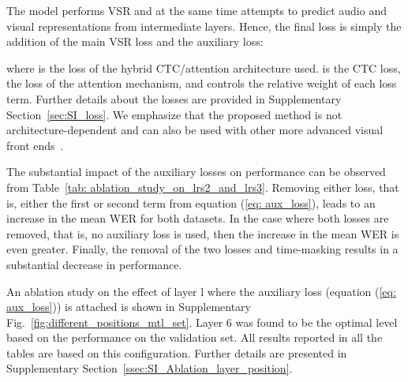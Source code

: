 \documentclass[twocolumn]{article}
\begin{document}
The model performs VSR and at the same time attempts to predict audio and visual representations from intermediate layers. Hence, the final loss is simply the addition of the main VSR loss and the auxiliary loss:





where  is the loss of the hybrid CTC/attention architecture used.  is the CTC loss,  the loss of the attention mechanism, and  controls the relative weight of each loss term. Further details about the losses are provided in Supplementary Section~\ref{sec:SI_loss}. We emphasize that the proposed method is not architecture-dependent and can also be used with other more advanced visual front ends~\cite{serdyuk2022transformer}.

The substantial impact of the auxiliary losses on performance can be observed from Table~\ref{tab: ablation_study_on_lrs2_and_lrs3}. Removing either loss, that is, either the first or second term from equation (\ref{eq: aux_loss}), leads to an increase in the mean WER for both datasets. In the case where both losses are removed, that is, no auxiliary loss is used, then the increase in the mean WER is even greater. Finally, the removal of the two losses and time-masking results in a substantial decrease in performance.

An ablation study on the effect of layer l where the auxiliary loss (equation (\ref{eq: aux_loss})) is attached is shown in Supplementary Fig.~\ref{fig:different_positions_mtl_set}. Layer 6 was found to be the optimal level based on the performance on the validation set. All results reported in all the tables are based on this configuration. Further details are presented in Supplementary Section~\ref{ssec:SI_Ablation_layer_position}.
\end{document}
